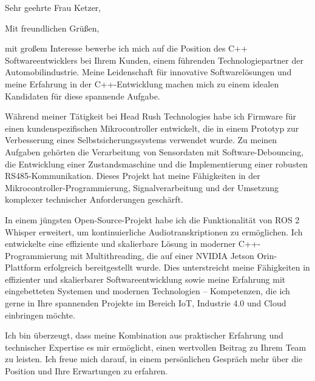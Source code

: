 \documentclass[11pt,a4paper,skipsamekey]{moderncv}
\begin{document}
	\date{\today}
	\opening{Sehr geehrte Frau Ketzer,}
	\closing{Mit freundlichen Grüßen,}
	\makelettertitle
	
	mit großem Interesse bewerbe ich mich auf die Position des C++ Softwareentwicklers bei Ihrem Kunden, einem führenden Technologiepartner der Automobilindustrie. Meine Leidenschaft für innovative Softwarelösungen und meine Erfahrung in der C++-Entwicklung machen mich zu einem idealen Kandidaten für diese spannende Aufgabe.
	
	Während meiner Tätigkeit bei Head Rush Technologies habe ich Firmware für einen kundenspezifischen Mikrocontroller entwickelt, die in einem Prototyp zur Verbesserung eines Selbstsicherungssystems verwendet wurde. Zu meinen Aufgaben gehörten die Verarbeitung von Sensordaten mit Software-Debouncing, die Entwicklung einer Zustandsmaschine und die Implementierung einer robusten RS485-Kommunikation. Dieses Projekt hat meine Fähigkeiten in der Mikrocontroller-Programmierung, Signalverarbeitung und der Umsetzung komplexer technischer Anforderungen geschärft.
	
	In einem jüngsten Open-Source-Projekt habe ich die Funktionalität von ROS 2 Whisper erweitert, um kontinuierliche Audiotranskriptionen zu ermöglichen. Ich entwickelte eine effiziente und skalierbare Lösung in moderner C++-Programmierung mit Multithreading, die auf einer NVIDIA Jetson Orin-Plattform erfolgreich bereitgestellt wurde. 
	Dies unterstreicht meine Fähigkeiten in effizienter und skalierbarer Softwareentwicklung sowie meine Erfahrung mit eingebetteten Systemen und modernen Technologien – Kompetenzen, die ich gerne in Ihre spannenden Projekte im Bereich IoT, Industrie 4.0 und Cloud einbringen möchte.
	
	Ich bin überzeugt, dass meine Kombination aus praktischer Erfahrung und technischer Expertise es mir ermöglicht, einen wertvollen Beitrag zu Ihrem Team zu leisten. Ich freue mich darauf, in einem persönlichen Gespräch mehr über die Position und Ihre Erwartungen zu erfahren.

	\vspace{0.5cm}
	\makeletterclosing
	
	
	
	
\end{document}
